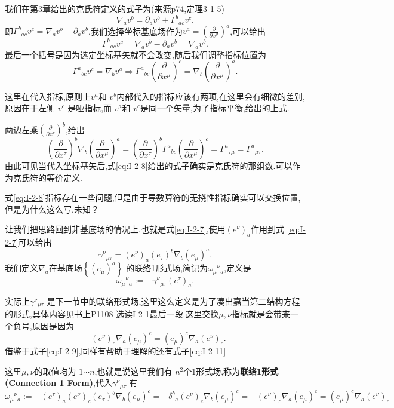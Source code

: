 \documentclass[../main.tex]{subfiles}
\begin{document}
我们在第3章给出的克氏符定义的式子为(来源p74,定理3-1-5)\[
\nabla_av^b = \partial_av^b + \Gamma^{b}{}_{ac}v^c 
.\] 
即$\Gamma^{b}{}_{ac}v^c = \nabla_a v^b -\partial_a v^b$,我们选择坐标基底场作为$v^a = (\frac{\partial   }{\partial x^\sigma} )^a$,可以给出 \[
\Gamma^{b}{}_{ac}v^c = \nabla_a v^b -\partial_a v^b = \nabla_a v^b 
.\] 
最后一个括号是因为选定坐标基矢就不会改变,随后我们调整指标位置为\[
\Gamma^{a}{}_{bc}v^c = \nabla_b v^a \Rightarrow  \Gamma^{a}{}_{bc}(\frac{\partial}{\partial x^\mu} )^c = \nabla_b (\frac{\partial   }{\partial x^\mu} )^a
.\]
\begin{note}
 这里在代入指标,原则上$v^a$和 $v^b$内部代入的指标应该有两项,在这里会有细微的差别,原因在于左侧 $v^c$ 是哑指标,而 $v^a$和 $v^c$是同一个矢量,为了指标平衡,给出的上式.
\end{note}
两边左乘$(\frac{\partial   }{\partial x^\tau})^b$,给出\[
  (\frac{\partial   }{\partial x^\tau} )^b \nabla_b (\frac{\partial   }{\partial x^\mu} )^a = (\frac{\partial   }{\partial x^\tau})^b\Gamma^{a}{}_{bc}(\frac{\partial}{\partial x^\mu} )^c = \Gamma^{a}{}_{\tau\mu} = \Gamma^{a}{}_{\mu\tau}  
.\] 
由此可见当代入坐标基矢后,式\ref{eq:I-2-8}给出的式子确实是克氏符的那组数.可以作为克氏符的等价定义.
\begin{note}
  式\ref{eq:I-2-8}指标存在一些问题,但是由于导数算符的无挠性指标确实可以交换位置,但是为什么这么写,未知？ 
\end{note}
让我们把思路回到非基底场的情况上,也就是式\ref{eq:I-2-7},使用$(e^\nu)_a$作用到式 \ref{eq:I-2-7}可以给出 \[
\gamma^{\nu}{}_{\mu\tau} =(e^\nu)_a  (e_\tau)^b\nabla _b(e_\mu)^a
.\] 
我们定义$\nabla _a$在基底场$\left\{ (e_\mu)^a \right\} $ 的联络1形式场,简记为$\omega_\mu{}^{\nu}{}_{a}$,定义是\[
  \omega_\mu{}^{\nu}{}_{a} := -\gamma^{\nu}{}_{\mu\tau}(e^\tau)_a
.\] 
\begin{note}
  实际上$\gamma^{\nu}{}_{\mu \tau}$ 是下一节中的联络形式场,这里这么定义是为了凑出嘉当第二结构方程的形式,具体内容见书上P1108 选读I-2-1最后一段.这里交换$\mu ,\nu$指标就是会带来一个负号,原因是因为\[
 - (e^\nu)_c \nabla _a(e_\mu)^c = (e_\mu)^c\nabla_a(e^\nu)_c 
.\]借鉴于式子\ref{eq:I-2-9},同样有帮助于理解的还有式子\ref{eq:I-2-11}
\end{note}
这里$\mu,\nu$的取值均为 $1 \cdots n$,也就是说这里我们有 $n^2$个1形式场,称为\textbf{联络1形式(Connection 1 Form)},代入$\gamma^{\nu}{}_{\mu\tau}$ 有
\begin{equation}
  \omega_\mu{}^{\nu}{}_{a} := -(e^\tau)_a(e^\nu)_c(e_\tau)^b\nabla _b(e_\mu)^c = - \delta^{b}{}_{a}(e^\nu)_c \nabla_b(e_\mu)^c = - (e^\nu)_c \nabla _a(e_\mu)^c = (e_\mu)^c\nabla_a(e^\nu)_c 
  \label{eq:I-2-9}
\end{equation}
\end{document}
